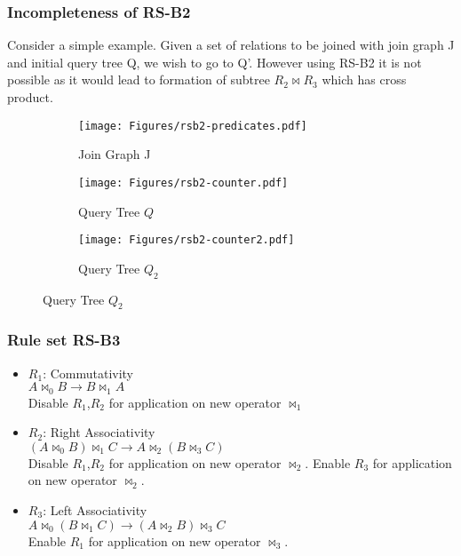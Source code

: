 \documentclass{beamer}
\begin{document}
  \begin{frame}
  \frametitle{Incompleteness of RS-B2}
  Consider a simple example. Given a set of relations to be joined with join graph J and initial query tree Q, we wish to go to Q'. However using RS-B2 it is not possible as it would lead to formation of subtree $R_2 \bowtie R_3$ which has cross product.
\begin{figure}[ht]
\centering
\begin{subfigure}[b]{0.24\linewidth}
\texttt{[image: Figures/rsb2-predicates.pdf]}
\caption{Join Graph J}
\label{fig:rsb2-counter}
\end{subfigure}
\begin{subfigure}[b]{0.35\linewidth}
	\texttt{[image: Figures/rsb2-counter.pdf]}
\caption{Query Tree $Q$}
\label{fig:minipage1}
\end{subfigure}
\begin{subfigure}[b]{0.35\linewidth}
	\texttt{[image: Figures/rsb2-counter2.pdf]}
\caption{Query Tree $Q_{2}$}
\label{fig:minipage2}
\end{subfigure}
\end{figure}

  \end{frame}
  
  \begin{frame}
  \frametitle{Rule set RS-B3}
\begin{itemize}
	\item $R_{1}$: Commutativity \\ $A \bowtie_{0} B \rightarrow B \bowtie_{1} A$ \\
	Disable $R_{1}$,$R_{2}$ for application on new operator $\bowtie_{1}$
	\item $R_{2}$: Right Associativity \\ $(A \bowtie_{0} B) \bowtie_{1} C \rightarrow A \bowtie_{2} (B \bowtie_{3} C)$ \\
	Disable $R_{1}$,$R_{2}$ for application on new operator $\bowtie_{2}$. Enable $R_{3}$ for application on new operator $\bowtie_{2}$.		
	\item $R_{3}$: Left Associativity \\ $A \bowtie_{0} (B \bowtie_{1} C) \rightarrow (A \bowtie_{2} B) \bowtie_{3} C$ \\
	Enable $R_{1}$ for application on new operator $\bowtie_{3}$.
\end{itemize}
  \end{frame}
  
\end{document}
